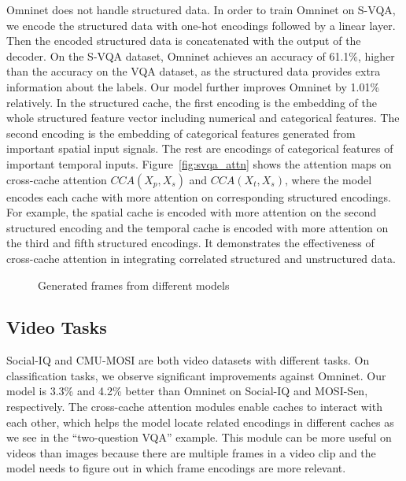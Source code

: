 \documentclass{article}
\begin{document}
Omninet does not handle structured data. In order to train Omninet on S-VQA, we encode the structured data with one-hot encodings followed by a linear layer. Then the encoded structured data is concatenated with the output of the decoder. On the S-VQA dataset, Omninet achieves an accuracy of 61.1\%, higher than the accuracy on the VQA dataset, as the structured data provides extra information about the labels. Our model further improves Omninet by 1.01\% relatively. In the structured cache, the first encoding is the embedding of the whole structured feature vector including numerical and categorical features. The second encoding is the embedding of categorical features generated from important spatial input signals. The rest are encodings of categorical features of important temporal inputs. Figure~\ref{fig:svqa_attn} shows the attention maps on cross-cache attention $CCA(X_{p}, X_{s})$ and $CCA(X_{t}, X_{s})$, where the model encodes each cache with more attention on corresponding structured encodings. For example, the spatial cache is encoded with more attention on the second structured encoding and the temporal cache is encoded with more attention on the third and fifth structured encodings. It demonstrates the effectiveness of cross-cache attention in integrating correlated structured and unstructured data.

\begin{figure}
    \centering
    \captionsetup{justification=centering}


    \caption{Generated frames from different models}
    \label{fig:mosi-gen}
\end{figure}

\subsection{Video Tasks}

Social-IQ and CMU-MOSI are both video datasets with different tasks. On classification tasks, we observe significant improvements against Omninet. Our model is 3.3\% and 4.2\% better than Omninet on Social-IQ and MOSI-Sen, respectively. The cross-cache attention modules enable caches to interact with each other, which helps the model locate related encodings in different caches as we see in the ``two-question VQA'' example. This module can be more useful on videos than images because there are multiple frames in a video clip and the model needs to figure out in which frame encodings are more relevant. 
\end{document}
